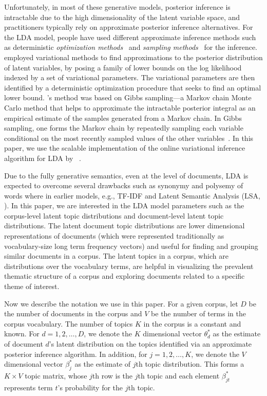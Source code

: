 Unfortunately, in most of these generative models, posterior 
inference is intractable due to the high dimensionality of the 
latent variable space, and practitioners typically rely on 
approximate posterior inference alternatives. For the LDA model, 
people have used different approximate inference methods such as 
deterministic \textsl{optimization methods}~\cite{Blei2003} and 
\textsl{sampling methods}~\cite{Griffiths2004} for the inference. 
\citeauthor{Blei2003} employed variational methods to find 
approximations to the posterior distribution of latent variables, by 
posing a family of lower bounds on the log likelihood indexed 
by a set of variational parameters. The variational parameters are 
then identified by a deterministic optimization procedure that seeks 
to find an optimal lower bound. \citeauthor{Griffiths2004}'s method 
was based on Gibbs sampling---a Markov chain Monte Carlo 
method that helps to approximate the intractable posterior integral 
as an empirical estimate of the samples generated from a Markov chain.   
In Gibbs sampling, one forms the Markov chain by repeatedly sampling 
each variable conditional on the most recently sampled values of the 
other variables~\cite{Geman1984}. In this paper, we use the scalable 
implementation of the online variational inference algorithm for LDA
\cite{hoffman2010online} by~\citeauthor{rehurek_lrec} 
\citeyear{rehurek_lrec}. 


Due to the fully generative semantics, even at the level of 
documents, LDA is expected to overcome several drawbacks such as 
synonymy and polysemy of words where in earlier models, e.g., TF-IDF
\cite{Salton1975} and Latent Semantic Analysis (LSA, \citeauthor{Dumais1995} 
\citeyear{Dumais1995}). In this paper, we are interested in the LDA 
model parameters such as the corpus-level latent topic distributions 
and document-level latent topic distributions. The latent document 
topic distributions are lower dimensional representations of 
documents (which were represented traditionally as vocabulary-size 
long term frequency vectors) 
and useful for finding and grouping similar documents in a corpus. 
The latent topics in a corpus, which are distributions over the 
vocabulary terms, are helpful in visualizing the prevalent thematic 
structure of a corpus and exploring documents related to a specific 
theme of interest. 

Now we describe the notation we use in this paper. For a given corpus, 
let $D$ be the number of documents in the corpus and $V$ be the 
number of terms in the corpus vocabulary. The number of topics $K$ 
in the corpus is a constant and known. For $d = 1, 2, \ldots, D$, we 
denote the $K$ dimensional vector $\theta_d^{*}$ as the estimate of 
document $d$'s latent distribution on the topics identified via an 
approximate posterior inference algorithm. In addition, for $j = 1, 
2, \ldots, K$, we denote the $V$ dimensional vector $\beta_j^{*}$ as 
the estimate of $j$th topic distribution. This forms a $K \times V$ 
topic matrix, whose $j$th row is the $j$th topic and each element 
$\beta_{jt}^{*}$ represents term $t$'s probability for the 
$j$th topic.   





